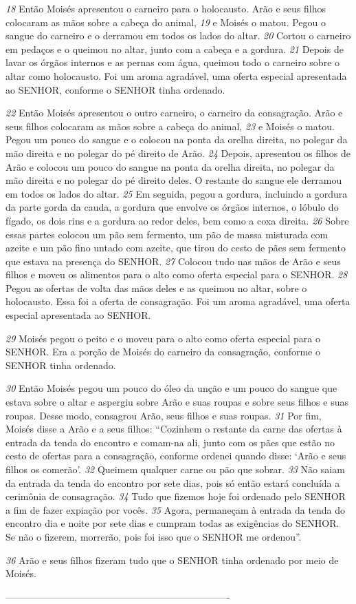\smallskip
\textit{\tiny 18}
Então Moisés apresentou o carneiro para o holocausto. Arão e seus filhos
colocaram as mãos sobre a cabeça do animal, 
\textit{\tiny 19}
e Moisés o matou. Pegou o sangue
do carneiro e o derramou em todos os lados do altar. 
\textit{\tiny 20}
Cortou o carneiro em
pedaços e o queimou no altar, junto com a cabeça e a gordura. 
\textit{\tiny 21}
Depois de lavar
os órgãos internos e as pernas com água, queimou todo o carneiro sobre o altar
como holocausto. Foi um aroma agradável, uma oferta especial apresentada ao
SENHOR, conforme o SENHOR tinha ordenado.
   
\smallskip
\textit{\tiny 22}
Então Moisés apresentou o outro carneiro, o carneiro da consagração. Arão e
seus filhos colocaram as mãos sobre a cabeça do animal, 
\textit{\tiny 23}
e Moisés o matou.
Pegou um pouco do sangue e o colocou na ponta da orelha direita, no polegar da
mão direita e no polegar do pé direito de Arão. 
\textit{\tiny 24}
Depois, apresentou os filhos de
Arão e colocou um pouco do sangue na ponta da orelha direita, no polegar da mão
direita e no polegar do pé direito deles. O restante do sangue ele derramou em
todos os lados do altar.
\textit{\tiny 25}
Em seguida, pegou a gordura, incluindo a gordura da parte gorda da cauda, a
gordura que envolve os órgãos internos, o lóbulo do fígado, os dois rins e a
gordura ao redor deles, bem como a coxa direita. 
\textit{\tiny 26}
Sobre essas partes colocou um
pão sem fermento, um pão de massa misturada com azeite e um pão fino untado
com azeite, que tirou do cesto de pães sem fermento que estava na presença do
SENHOR. 
\textit{\tiny 27}
Colocou tudo nas mãos de Arão e seus filhos e moveu os alimentos para
o alto como oferta especial para o SENHOR. 
\textit{\tiny 28}
Pegou as ofertas de volta das mãos
deles e as queimou no altar, sobre o holocausto. Essa foi a oferta de consagração.
Foi um aroma agradável, uma oferta especial apresentada ao SENHOR. 

\smallskip
\textit{\tiny 29}
Moisés
pegou o peito e o moveu para o alto como oferta especial para o SENHOR. Era a
porção de Moisés do carneiro da consagração, conforme o SENHOR tinha
ordenado.
   
\smallskip
\textit{\tiny 30}
Então Moisés pegou um pouco do óleo da unção e um pouco do sangue que
estava sobre o altar e aspergiu sobre Arão e suas roupas e sobre seus filhos e suas
roupas. Desse modo, consagrou Arão, seus filhos e suas roupas.
\textit{\tiny 31}
Por fim, Moisés disse a Arão e a seus filhos: “Cozinhem o restante da carne
das ofertas à entrada da tenda do encontro e comam-na ali, junto com os pães que
estão no cesto de ofertas para a consagração, conforme ordenei quando disse:
‘Arão e seus filhos os comerão’. 
\textit{\tiny 32}
Queimem qualquer carne ou pão que sobrar.
\textit{\tiny 33}
Não saiam da entrada da tenda do encontro por sete dias, pois só então estará
concluída a cerimônia de consagração. 
\textit{\tiny 34}
Tudo que fizemos hoje foi ordenado
pelo SENHOR a fim de fazer expiação por vocês. 
\textit{\tiny 35}
Agora, permaneçam à entrada
da tenda do encontro dia e noite por sete dias e cumpram todas as exigências do
SENHOR. Se não o fizerem, morrerão, pois foi isso que o SENHOR me ordenou”.

\smallskip
\textit{\tiny 36}
Arão e seus filhos fizeram tudo que o SENHOR tinha ordenado por meio de
Moisés.



----------------------------------------------------------------------
